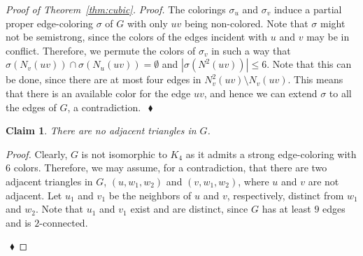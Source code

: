 \documentclass[12pt,a4paper]{article}
\newtheorem{claim}{Claim}
\newenvironment{proofclaim}[1][]%
    {\noindent \emph{Proof.} {}{#1}{}}{$~$\hfill $~\blacklozenge$ \vspace{0.2cm}}
\begin{document}
\begin{proof}[Proof of Theorem~\ref{thm:cubic}]
\begin{proofclaim}
		The colorings $\sigma_u$ and $\sigma_v$ induce a partial proper edge-coloring $\sigma$ of $G$ with only $uv$ being non-colored.
		Note that $\sigma$ might not be semistrong, since the colors of the edges incident with $u$ and $v$ may be in conflict.
		Therefore, we permute the colors of $\sigma_v$ in such a way that		
		$\sigma(N_v(uv))\cap\sigma(N_u(uv))=\emptyset$ and $|\sigma(N^2(uv))| \le 6$. 
		Note that this can be done, since there are at most four edges in $N^2_v(uv)\setminus N_v(uv)$. %
		This means that there is an available color for the edge $uv$,
		and hence we can extend $\sigma$ to all the edges of $G$, a contradiction.
	\end{proofclaim}
	
	\begin{claim}
		\label{cl:33}
		There are no adjacent triangles in $G$.
	\end{claim}
	
	\begin{proofclaim}
		Clearly, $G$ is not isomorphic to $K_4$ as it admits a strong edge-coloring with $6$ colors.
		Therefore, we may assume, for a contradiction, that there are two adjacent triangles in $G$,
		$(u,w_1,w_2)$ and $(v,w_1,w_2)$, where $u$ and $v$ are not adjacent.
		Let $u_1$ and $v_1$ be the neighbors of $u$ and $v$, respectively, distinct from $w_1$ and $w_2$.
		Note that $u_1$ and $v_1$ exist and are distinct, since $G$ has at least $9$ edges and is $2$-connected.
		

\end{proofclaim}
\end{proof}
\end{document}
